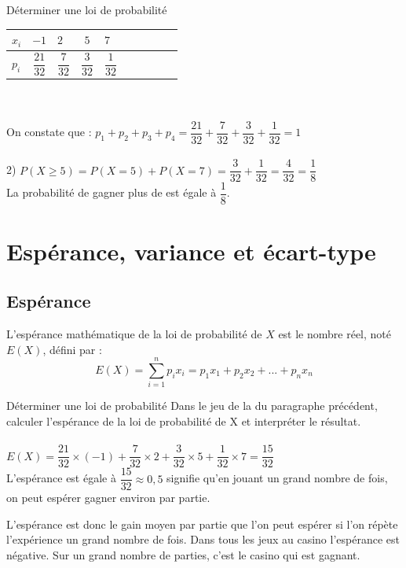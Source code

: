 \begin{bmethodet}{Déterminer une loi de probabilité}
\begin{tabular}{ | Xc | Xc | Xc | Xc | Xc |}
         \hline			
           $x_i$  & $-1$ & $2$ & $5$ & $7$ \\ \hline
           $p_i$ & $\dfrac{21}{32}$ & $\dfrac{7}{32}$ & $\dfrac{3}{32}$ & $\dfrac{1}{32}$ \\
         \hline  
    \end{tabular}
    \ \\
    \ \\
    On constate que : $p_1 + p_2 + p_3 + p_4  = \dfrac{21}{32} + \dfrac{7}{32} + \dfrac{3}{32} + \dfrac{1}{32} = 1$\\
    \ \\
    2) $P(X \geq 5) = P(X = 5) + P(X = 7) = \dfrac{3}{32} + \dfrac{1}{32} = \dfrac{4}{32} = \dfrac{1}{8}$\\
    La probabilité de gagner plus de  est égale à $\dfrac{1}{8}$.
\end{bmethodet}

\section{Espérance, variance et écart-type}

\subsection{Espérance}

\begin{bdefi}
L'espérance mathématique de la loi de probabilité de $X$ est le nombre réel, noté $E(X)$, défini par :\\
        $$E(X) = \sum_{i=1}^{n} p_ix_i = p_1x_1 + p_2x_2 + ... + p_nx_n$$
\end{bdefi}

\begin{bmethodet}{Déterminer une loi de probabilité}
    Dans le jeu de la  du paragraphe précédent, calculer l'espérance de la loi de probabilité de X et interpréter le résultat.\\
    \ \\
    	$E(X) = \dfrac{21}{32} \times (-1)+ \dfrac{7}{32} \times 2+ \dfrac{3}{32} \times 5+\dfrac{1}{32} \times 7=\dfrac{15}{32}$\\
    L'espérance est égale à $\dfrac{15}{32}\approx 0,5$ signifie qu'en jouant un grand nombre de fois, on peut espérer gagner environ  par partie.
\end{bmethodet}

\begin{brmq}
    L'espérance est donc le gain moyen par partie que l'on peut espérer si l'on répète l'expérience un grand nombre de fois. Dans tous les jeux au casino l'espérance est négative. Sur un grand nombre de parties, c'est le casino qui est gagnant.
\end{brmq}

